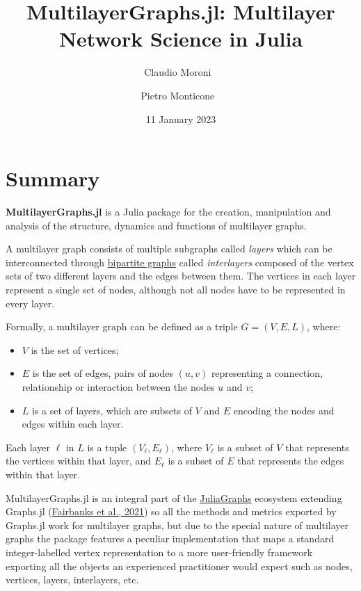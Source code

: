 \documentclass[
]{article}
\title{MultilayerGraphs.jl: Multilayer Network Science in Julia}
\author[1,2%
  *%
  ]{Claudio Moroni%
    \,\orcidlink{0000-0003-1274-6937}\,%
    }
\author[1,2%
  *%
  ]{Pietro Monticone%
    \,\orcidlink{0000-0002-2731-9623}\,%
    }
\affil[1]{University of Turin, Italy}
\affil[2]{Interdisciplinary Physics Team, Italy}
\affil[*]{These authors contributed equally.}
\date{11 January 2023}
\providecommand{\tightlist}{%
  \setlength{\itemsep}{0pt}\setlength{\parskip}{0pt}}
\begin{document}
\maketitle

\hypertarget{summary}{%
\section{Summary}\label{summary}}

\textbf{MultilayerGraphs.jl} is a Julia package for the creation,
manipulation and analysis of the structure, dynamics and functions of
multilayer graphs.

A multilayer graph consists of multiple subgraphs called \emph{layers}
which can be interconnected through
\href{https://en.wikipedia.org/wiki/Bipartite_graph}{bipartite graphs}
called \emph{interlayers} composed of the vertex sets of two different
layers and the edges between them. The vertices in each layer represent
a single set of nodes, although not all nodes have to be represented in
every layer.

Formally, a multilayer graph can be defined as a triple \(G=(V,E,L)\),
where:

\begin{itemize}
\tightlist
\item
  \(V\) is the set of vertices;
\item
  \(E\) is the set of edges, pairs of nodes \((u, v)\) representing a
  connection, relationship or interaction between the nodes \(u\) and
  \(v\);
\item
  \(L\) is a set of layers, which are subsets of \(V\) and \(E\)
  encoding the nodes and edges within each layer.
\end{itemize}

Each layer \(\ell\) in \(L\) is a tuple \((V_\ell, E_\ell)\), where
\(V_\ell\) is a subset of \(V\) that represents the vertices within that
layer, and \(E_\ell\) is a subset of \(E\) that represents the edges
within that layer.

MultilayerGraphs.jl is an integral part of the
\href{https://github.com/JuliaGraphs}{JuliaGraphs} ecosystem extending
Graphs.jl (\protect\hyperlink{ref-Graphs2021}{Fairbanks et al., 2021})
so all the methods and metrics exported by Graphs.jl work for multilayer
graphs, but due to the special nature of multilayer graphs the package
features a peculiar implementation that maps a standard integer-labelled
vertex representation to a more user-friendly framework exporting all
the objects an experienced practitioner would expect such as nodes,
vertices, layers, interlayers, etc.
\end{document}
